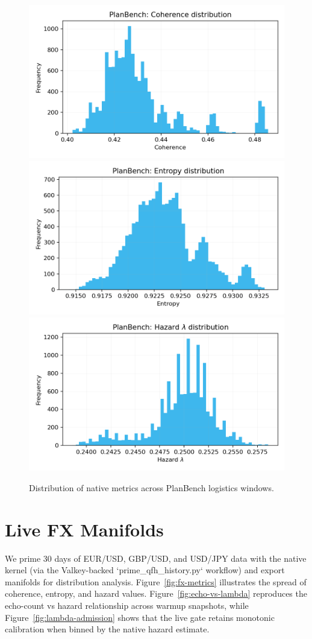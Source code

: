 \documentclass[11pt]{article}
\begin{document}
\begin{figure}[t]
  \centering
  \includegraphics[width=0.32\linewidth]{../figures/planbench_metrics/planbench_coherence_hist.png}
  \includegraphics[width=0.32\linewidth]{../figures/planbench_metrics/planbench_entropy_hist.png}
  \includegraphics[width=0.32\linewidth]{../figures/planbench_metrics/planbench_lambda_hist.png}
  \caption{Distribution of native metrics across PlanBench logistics windows.}
  \label{fig:planbench-metrics}
\end{figure}

\section{Live FX Manifolds}
We prime 30 days of EUR/USD, GBP/USD, and USD/JPY data with the native kernel (via the Valkey-backed `prime\_qfh\_history.py` workflow) and export manifolds for distribution analysis. Figure~\ref{fig:fx-metrics} illustrates the spread of coherence, entropy, and hazard values. Figure~\ref{fig:echo-vs-lambda} reproduces the echo-count vs hazard relationship across warmup snapshots, while Figure~\ref{fig:lambda-admission} shows that the live gate retains monotonic calibration when binned by the native hazard estimate.
\end{document}

